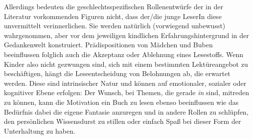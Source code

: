     Allerdings bedeuten die geschlechtsspezifischen Rollenentwürfe der in der
    Literatur vorkommenden Figuren nicht, dass der/die junge LeserIn diese
    unvermittelt verinnerlichen. Sie werden natürlich (vorwiegend unbewusst)
    wahrgenommen, aber vor dem jeweiligen kindlichen Erfahrungshintergrund  in
    der Gedankenwelt konstruiert. Prädispositionen von Mädchen und Buben
    beeinflussen folglich auch die Akzeptanz oder Ablehnung eines Lesestoffs.
    Wenn Kinder also nicht gezwungen sind, sich mit einem bestimmten
    Lektüreangebot zu beschäftigen, hängt die Leseentscheidung von Belohnungen
    ab, die erwartet werden. Diese sind intrinsischer Natur und können auf
    emotionaler, sozialer oder kognitiver Ebene erfolgen: Der Wunsch, bei
    Themen, die gerade \emph{in} sind, mitreden zu können, kann die Motivation
    ein Buch zu lesen ebenso beeinflussen wie das Bedürfnis dabei die eigene
    Fantasie anzuregen und in andere Rollen zu schlüpfen, den persönlichen
    Wissensdurst zu stillen oder einfach Spaß bei dieser Form der Unterhaltung
    zu haben. \parencite[547\psq]{Kuhn2010}